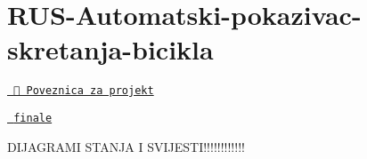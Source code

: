 \chapter{RUS-\/\+Automatski-\/pokazivac-\/skretanja-\/bicikla}
\hypertarget{index}{}\label{index}
\label{index_md__f_1_2_desktop_2_i_t_2_diplomski_22_8_01semestar_2_razvoj_01ugradbenih_01sustava_2_r_u_s-_automatski-pokazivac-skretanja-bicikla_2_r_e_a_d_m_e}%
%


\href{https://wokwi.com/projects/429320227133652993}{\texttt{ 🔗 Poveznica za projekt}}



\href{https://wokwi.com/projects/429320227133652993}{\texttt{ finale}}

DIJAGRAMI STANJA I SVIJESTI!!!!!!!!!!!! 